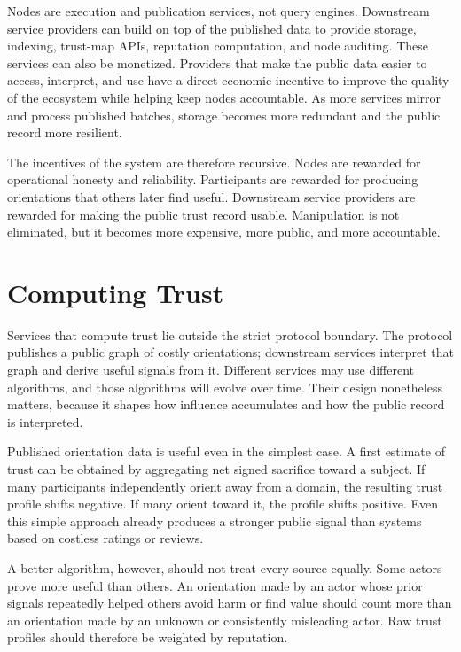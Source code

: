 \documentclass[11pt]{article}
\begin{document}
Nodes are execution and publication services, not query engines. Downstream service providers can build on top of the published data to provide storage, indexing, trust-map APIs, reputation computation, and node auditing. These services can also be monetized. Providers that make the public data easier to access, interpret, and use have a direct economic incentive to improve the quality of the ecosystem while helping keep nodes accountable. As more services mirror and process published batches, storage becomes more redundant and the public record more resilient.

The incentives of the system are therefore recursive. Nodes are rewarded for operational honesty and reliability. Participants are rewarded for producing orientations that others later find useful. Downstream service providers are rewarded for making the public trust record usable. Manipulation is not eliminated, but it becomes more expensive, more public, and more accountable.

\section{Computing Trust}

Services that compute trust lie outside the strict protocol boundary. The protocol publishes a public graph of costly orientations; downstream services interpret that graph and derive useful signals from it. Different services may use different algorithms, and those algorithms will evolve over time. Their design nonetheless matters, because it shapes how influence accumulates and how the public record is interpreted.

Published orientation data is useful even in the simplest case. A first estimate of trust can be obtained by aggregating net signed sacrifice toward a subject. If many participants independently orient away from a domain, the resulting trust profile shifts negative. If many orient toward it, the profile shifts positive. Even this simple approach already produces a stronger public signal than systems based on costless ratings or reviews.

A better algorithm, however, should not treat every source equally. Some actors prove more useful than others. An orientation made by an actor whose prior signals repeatedly helped others avoid harm or find value should count more than an orientation made by an unknown or consistently misleading actor. Raw trust profiles should therefore be weighted by reputation.
\end{document}

